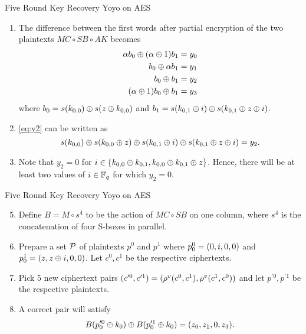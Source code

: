 \documentclass[notheorems]{beamer}
\theoremstyle{definition}
\theoremstyle{example}
\begin{document}
    \begin{frame}[<+->]{Five Round Key Recovery Yoyo on AES}
        \begin{enumerate}
            \item The difference between the first words after partial
            encryption of the two plaintexts \(MC \circ SB \circ AK\) becomes
            \begin{align}
                \alpha b_0 \oplus (\alpha \oplus 1)b_1 &= y_0 \\
                b_0 \oplus \alpha b_1 &= y_1 \\
                b_0 \oplus b_1 &= y_2 \label{eq:y2} \\
                (\alpha \oplus 1)b_0 \oplus b_1 &= y_3
            \end{align}
            where \(b_0 = s(k_{0, 0}) \oplus s(z \oplus k_{0, 0})\)
            and \(b_1 = s(k_{0, 1} \oplus i) \oplus s(k_{0, 1} \oplus
            z \oplus i)\). 
            \item \eqref{eq:y2} can be written as
            \begin{equation}
                s(k_{0, 0}) \oplus s(k_{0, 0} \oplus z) \oplus s(k_{0, 1} \oplus i) \oplus s(k_{0, 1} \oplus z \oplus i) = y_2.
            \end{equation}
            \item Note that \(y_2 = 0\) for \(i \in \{k_{0, 0} \oplus k_{0,
            1}, k_{0, 0} \oplus k_{0, 1} \oplus z\}\). Hence, there will be at
            least two values of \(i \in \mathbb F_q\) for which \(y_2 = 0\).
        \end{enumerate}    
    \end{frame}

    \begin{frame}[<+->]{Five Round Key Recovery Yoyo on AES}
        \begin{enumerate}\setcounter{enumi}{4}
            \item Define \(B = M \circ s^4\) to be the action of \(MC \circ SB\)
            on one column, where \(s^4\) is the concatenation of four S-boxes in
            parallel.
            \item Prepare a set \(\mathcal P\) of plaintexts \(p^0\) and \(p^1\) where
            \(p_0^0 = (0, i, 0, 0)\) and \(p_0^1 = (z, z \oplus i, 0,
            0)\). Let \(c^0, c^1\) be the respective ciphertexts. 
            \item Pick 5 new ciphertext pairs \((c^{\prime 0}, c^{\prime
            1}) = (\rho^v(c^0, c^1), \rho^v(c^1, c^0))\) and let
            \(p^{\prime 0}, p^{\prime 1}\) be the respective plaintexts. 
            \item A correct pair will satisfy
            \begin{equation}
                B(p_0^{\prime 0} \oplus k_0) \oplus B(p_0^{\prime 1} \oplus k_0) = (z_0, z_1, 0, z_3).
                \label{eq:aes-5-rounds-check}
            \end{equation}
        \end{enumerate} 
    \end{frame}
\end{document}
